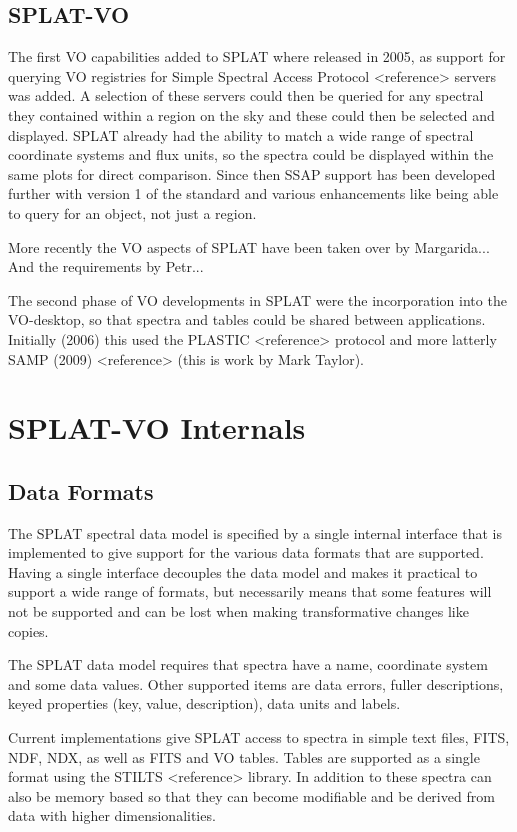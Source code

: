 \documentclass[final,authoryear,5p,times,twocolumn]{elsarticle}
\begin{document}
\subsection{SPLAT-VO}
The first VO capabilities added to SPLAT where released in 2005, as support
for querying VO registries for Simple Spectral Access Protocol <reference>
servers was added. A selection of these servers could then be queried for any
spectral they contained within a region on the sky and these could then be
selected and displayed. SPLAT already had the ability to match a wide range of
spectral coordinate systems and flux units, so the spectra could be displayed
within the same plots for direct comparison. Since then SSAP support has been
developed further with version 1 of the standard and various enhancements like
being able to query for an object, not just a region.

More recently the VO aspects of SPLAT have been taken over by Margarida...
And the requirements by Petr...

The second phase of VO developments in SPLAT were the incorporation into the
VO-desktop, so that spectra and tables could be shared between applications.
Initially (2006) this used the PLASTIC <reference> protocol and more latterly
SAMP (2009) <reference> (this is work by Mark Taylor).

\section{SPLAT-VO Internals}

\subsection{Data Formats}

The SPLAT spectral data model is specified by a single internal interface that
is implemented to give support for the various data formats that are
supported. Having a single interface decouples the data model and makes it
practical to support a wide range of formats, but necessarily means that some
features will not be supported and can be lost when making transformative
changes like copies.

The SPLAT data model requires that spectra have a name, coordinate system and
some data values. Other supported items are data errors, fuller descriptions,
keyed properties (key, value, description), data units and labels.

Current implementations give SPLAT access to spectra in simple text files,
FITS, NDF, NDX, as well as FITS and VO tables. Tables are supported as a
single format using the STILTS <reference> library. In addition to these
spectra can also be memory based so that they can become modifiable and be
derived from data with higher dimensionalities.
\end{document}
